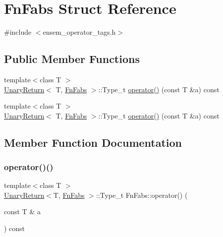 \hypertarget{structFnFabs}{}\section{Fn\+Fabs Struct Reference}
\label{structFnFabs}


{\ttfamily \#include $<$ensem\+\_\+operator\+\_\+tags.\+h$>$}

\subsection*{Public Member Functions}
\begin{DoxyCompactItemize}
\item 
{\footnotesize template$<$class T $>$ }\\\mbox{\hyperlink{structUnaryReturn}{Unary\+Return}}$<$ T, \mbox{\hyperlink{structFnFabs}{Fn\+Fabs}} $>$\+::Type\+\_\+t \mbox{\hyperlink{structFnFabs_a0813fbaa7b8028c3880585e4095fd2ca}{operator()}} (const T \&a) const
\item 
{\footnotesize template$<$class T $>$ }\\\mbox{\hyperlink{structUnaryReturn}{Unary\+Return}}$<$ T, \mbox{\hyperlink{structFnFabs}{Fn\+Fabs}} $>$\+::Type\+\_\+t \mbox{\hyperlink{structFnFabs_a0813fbaa7b8028c3880585e4095fd2ca}{operator()}} (const T \&a) const
\end{DoxyCompactItemize}


\subsection{Member Function Documentation}
\mbox{\label{structFnFabs_a0813fbaa7b8028c3880585e4095fd2ca}} 
\subsubsection{\texorpdfstring{operator()()}{operator()()}\hspace{0.1cm}{\footnotesize\ttfamily [1/2]}}
{\footnotesize\ttfamily template$<$class T $>$ \\
\mbox{\hyperlink{structUnaryReturn}{Unary\+Return}}$<$T, \mbox{\hyperlink{structFnFabs}{Fn\+Fabs}} $>$\+::Type\+\_\+t Fn\+Fabs\+::operator() (\begin{DoxyParamCaption}\item[{const T \&}]{a }\end{DoxyParamCaption}) const\hspace{0.3cm}{\ttfamily [inline]}}

